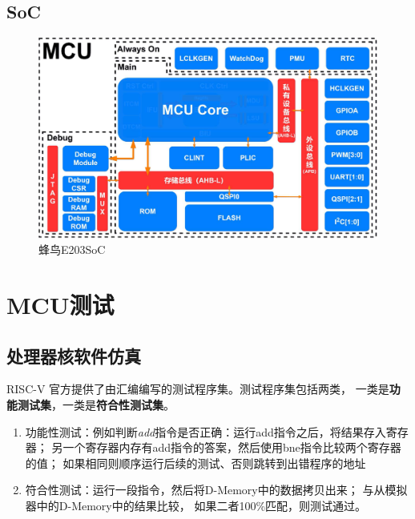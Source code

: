 \documentclass{article}
\begin{document}
\subsection{SoC}
\begin{figure}[H]
\begin{center}
  \includegraphics[width=\textwidth]{soc}
\end{center}
\caption{蜂鸟E203SoC}
\label{fig: SoC1}
\end{figure}

\section{MCU测试}
\subsection{处理器核软件仿真}
RISC-V 官方提供了由汇编编写的测试程序集。测试程序集包括两类，
一类是\textbf{功能测试集}，一类是\textbf{符合性测试集}\cite{riscv6}。
\begin{enumerate}
    \item 功能性测试：例如判断\textit{add}指令是否正确：运行add指令之后，将结果存入寄存器；
        另一个寄存器内存有add指令的答案，然后使用bne指令比较两个寄存器的值；
        如果相同则顺序运行后续的测试、否则跳转到出错程序的地址
    \item 符合性测试：运行一段指令，然后将D-Memory中的数据拷贝出来；
        与从模拟器中的D-Memory中的结果比较，
        如果二者100\%匹配，则测试通过。
\end{enumerate}
\end{document}
